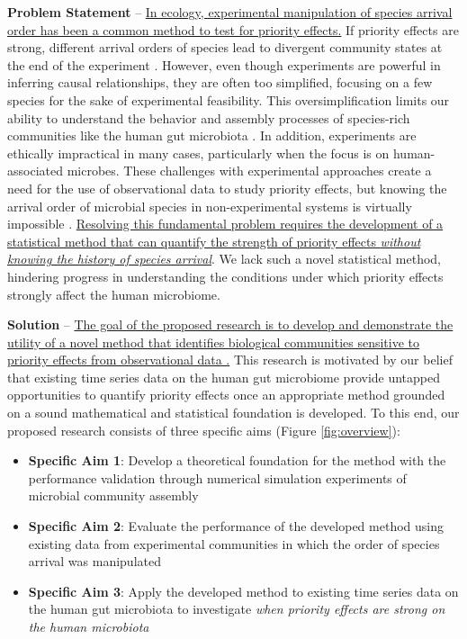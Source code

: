 \documentclass[12pt, class=article, crop=false]{standalone}
\begin{document}
\textbf{Problem Statement} --
\ul{In ecology, experimental manipulation of species arrival order has been a common method to test for priority effects.}
If priority effects are strong, different arrival orders of species lead to divergent community states at the end of the experiment \citep{fukami_historical_2015, sprockett_role_2018}.
However, even though experiments are powerful in inferring causal relationships, they are often too simplified, focusing on a few species for the sake of experimental feasibility.
This oversimplification limits our ability to understand the behavior and assembly processes of species-rich communities like the human gut microbiota \citep{fierer_animalcules_2012}. 
In addition, experiments are ethically impractical in many cases, particularly when the focus is on human-associated microbes. 
These challenges with experimental approaches create a need for the use of observational data to study priority effects, but knowing the arrival order of microbial species in non-experimental systems is virtually impossible  \citep{sprockett_role_2018}.
\ul{Resolving this fundamental problem requires the development of a statistical method that can quantify the strength of priority effects \textit{without knowing the history of species arrival}}.
We lack such a novel statistical method, hindering progress in understanding the conditions under which priority effects strongly affect the human microbiome.

\textbf{Solution} --
\ul{The goal of the proposed research is to develop and demonstrate the utility of a novel method that identifies biological communities sensitive to priority effects from observational data .}
This research is motivated by our belief that existing time series data on the human gut microbiome provide untapped opportunities to quantify priority effects once an appropriate method grounded on a sound mathematical and statistical foundation is developed.
To this end, our proposed research consists of three specific aims (Figure \ref{fig:overview}):

\begin{itemize}
    \item \textbf{Specific Aim 1}:  Develop a theoretical foundation for the method with the performance validation through numerical simulation experiments of microbial community assembly
    \item \textbf{Specific Aim 2}: Evaluate the performance of the developed method using existing data from experimental communities in which the order of species arrival was manipulated
    \item \textbf{Specific Aim 3}: Apply the developed method to existing time series data on the human gut microbiota to investigate \textit{when priority effects are strong on the human microbiota}
\end{itemize}
\end{document}
